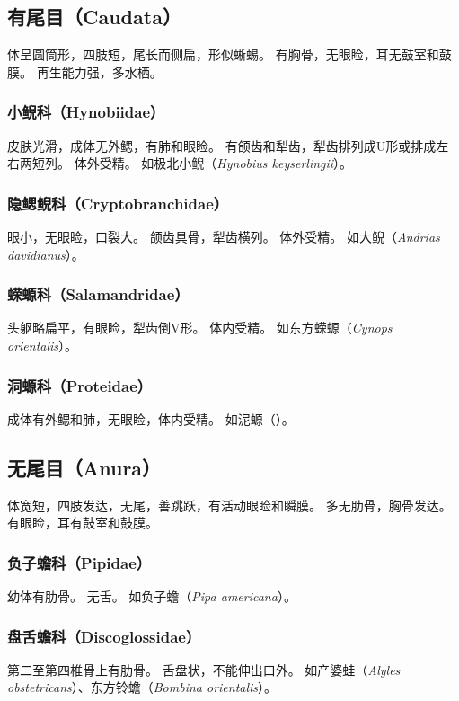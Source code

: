 \documentclass[11pt]{article}
\begin{document}
\subsection{有尾目（Caudata）}
体呈圆筒形，四肢短，尾长而侧扁，形似蜥蜴。
有胸骨，无眼睑，耳无鼓室和鼓膜。
再生能力强，多水栖。

\subsubsection{小鲵科（Hynobiidae）}
皮肤光滑，成体无外鳃，有肺和眼睑。
有颌齿和犁齿，犁齿排列成U形或排成左右两短列。
体外受精。
如极北小鲵（\textit{Hynobius keyserlingii}）。

\subsubsection{隐鳃鲵科（Cryptobranchidae）}
眼小，无眼睑，口裂大。
颌齿具骨，犁齿横列。
体外受精。
如大鲵（\textit{Andrias davidianus}）。

\subsubsection{蝾螈科（Salamandridae）}
头躯略扁平，有眼睑，犁齿倒V形。
体内受精。
如东方蝾螈（\textit{Cynops orientalis}）。

\subsubsection{洞螈科（Proteidae）}
成体有外鳃和肺，无眼睑，体内受精。
如泥螈（）。

\subsection{无尾目（Anura）}
体宽短，四肢发达，无尾，善跳跃，有活动眼睑和瞬膜。
多无肋骨，胸骨发达。
有眼睑，耳有鼓室和鼓膜。

\subsubsection{负子蟾科（Pipidae）}
幼体有肋骨。
无舌。
如负子蟾（\textit{Pipa americana}）。

\subsubsection{盘舌蟾科（Discoglossidae）}
第二至第四椎骨上有肋骨。
舌盘状，不能伸出口外。
如产婆蛙（\textit{Alyles obstetricans}）、东方铃蟾（\textit{Bombina orientalis}）。
\end{document}
